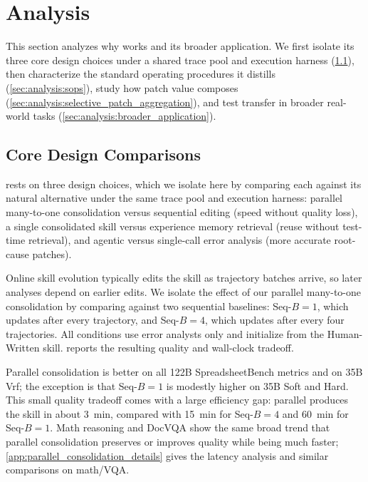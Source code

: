 \section{Analysis}
\label{sec:analysis}
\FloatBarrier
\suppressfloats[t]

This section analyzes why \systemname{} works and its broader application. We first isolate its three core design choices under a shared trace pool and execution harness (\cref{sec:analysis:core_design}), then characterize the standard operating procedures it distills (\cref{sec:analysis:sops}), study how patch value composes (\cref{sec:analysis:selective_patch_aggregation}), and test transfer in broader real-world tasks (\cref{sec:analysis:broader_application}).

\subsection{Core Design Comparisons}
\label{sec:analysis:core_design}

\systemname{} rests on three design choices, which we isolate here by comparing each against its natural alternative under the same trace pool and execution harness: parallel many-to-one consolidation versus sequential editing (speed without quality loss), a single consolidated skill versus experience memory retrieval (reuse without test-time retrieval), and agentic versus single-call error analysis (more accurate root-cause patches).

\begin{table}[H]
\centering

\end{table}

Online skill evolution typically edits the skill as trajectory batches arrive, so later analyses depend on earlier edits.
We isolate the effect of our parallel many-to-one consolidation by comparing against two sequential baselines: Seq-$B{=}1$, which updates after every trajectory, and Seq-$B{=}4$, which updates after every four trajectories.
All conditions use error analysts only and initialize from the Human-Written skill.
 reports the resulting quality and wall-clock tradeoff.


Parallel consolidation is better on all 122B SpreadsheetBench metrics and on 35B Vrf; the exception is that Seq-$B{=}1$ is modestly higher on 35B Soft and Hard.
This small quality tradeoff comes with a large efficiency gap: parallel produces the skill in about 3~min, compared with 15~min for Seq-$B{=}4$ and 60~min for Seq-$B{=}1$.
Math reasoning and DocVQA show the same broad trend that parallel consolidation preserves or improves quality while being much faster; \cref{app:parallel_consolidation_details} gives the latency analysis and similar comparisons on math/VQA.



